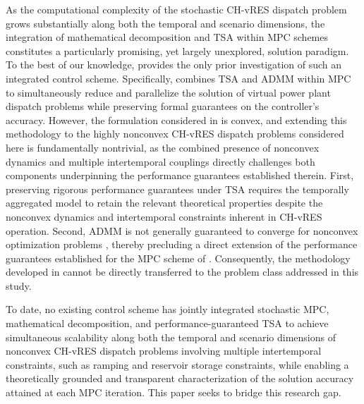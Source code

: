 \documentclass[a4paper,fleqn]{cas-sc}
\begin{document}
As the computational complexity of the stochastic CH-vRES dispatch problem grows substantially along both the temporal and scenario dimensions,
the integration of mathematical decomposition and TSA within MPC schemes constitutes a particularly promising, yet largely unexplored, solution paradigm.
To the best of our knowledge, \cite{santosuosso2026stochastic} provides the only prior investigation of such an integrated control scheme.
Specifically, \cite{santosuosso2026stochastic} combines TSA and ADMM within MPC to simultaneously reduce and parallelize the solution of virtual power plant dispatch problems while preserving formal guarantees on the controller's accuracy.
However, the formulation considered in \cite{santosuosso2026stochastic} is convex, and extending this methodology to the highly nonconvex CH-vRES dispatch problems considered here is fundamentally nontrivial,
as the combined presence of nonconvex dynamics and multiple intertemporal couplings directly challenges both components underpinning the performance guarantees established therein.
First, preserving rigorous performance guarantees under TSA requires the temporally aggregated model to retain the relevant theoretical properties despite the nonconvex dynamics and intertemporal constraints inherent in CH-vRES operation.
Second, ADMM is not generally guaranteed to converge for nonconvex optimization problems \cite{boyd2010distributed},
thereby precluding a direct extension of the performance guarantees established for the MPC scheme of \cite{santosuosso2026stochastic}.
Consequently, the methodology developed in \cite{santosuosso2026stochastic} cannot be directly transferred to the problem class addressed in this study.

To date, no existing control scheme has jointly integrated stochastic MPC, mathematical decomposition, and performance-guaranteed TSA
to achieve simultaneous scalability along both the temporal and scenario dimensions of nonconvex CH-vRES dispatch problems
involving multiple intertemporal constraints, such as ramping and reservoir storage constraints,
while enabling a theoretically grounded and transparent characterization of the solution accuracy attained at each MPC iteration.
This paper seeks to bridge this research gap.
\end{document}
